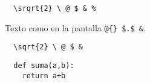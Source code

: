 \documentclass{article}
\begin{document}
\begin{verbatim}
  \srqrt{2} \ @ $ & %
\end{verbatim}

Texto como en la pantalla \verb|@{} $.$ &|.


\begin{verbatim}
  \sqrt{2} \ @ $ &
\end{verbatim}

\begin{verbatim}
  def suma(a,b):
    return a+b
\end{verbatim}
\end{document}
